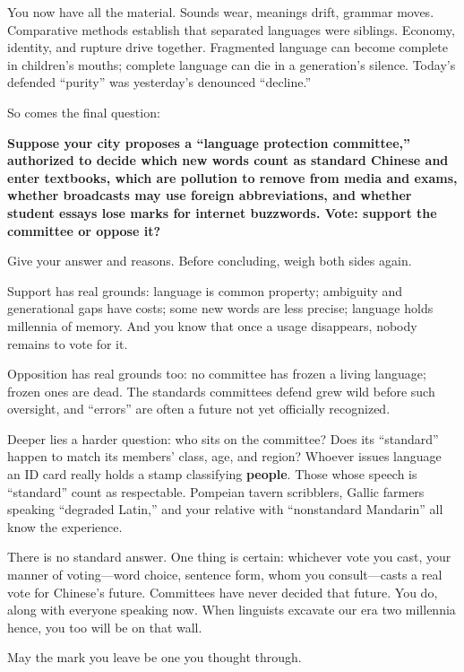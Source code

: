 You now have all the material. Sounds wear, meanings drift, grammar moves. Comparative methods establish that separated languages were siblings. Economy, identity, and rupture drive together. Fragmented language can become complete in children's mouths; complete language can die in a generation's silence. Today's defended ``purity'' was yesterday's denounced ``decline.''

So comes the final question:

\textbf{Suppose your city proposes a ``language protection committee,'' authorized to decide which new words count as standard Chinese and enter textbooks, which are pollution to remove from media and exams, whether broadcasts may use foreign abbreviations, and whether student essays lose marks for internet buzzwords. Vote: support the committee or oppose it?}

Give your answer and reasons. Before concluding, weigh both sides again.

Support has real grounds: language is common property; ambiguity and generational gaps have costs; some new words are less precise; language holds millennia of memory. And you know that once a usage disappears, nobody remains to vote for it.

Opposition has real grounds too: no committee has frozen a living language; frozen ones are dead. The standards committees defend grew wild before such oversight, and ``errors'' are often a future not yet officially recognized.

Deeper lies a harder question: who sits on the committee? Does its ``standard'' happen to match its members' class, age, and region? Whoever issues language an ID card really holds a stamp classifying \textbf{people}. Those whose speech is ``standard'' count as respectable. Pompeian tavern scribblers, Gallic farmers speaking ``degraded Latin,'' and your relative with ``nonstandard Mandarin'' all know the experience.

There is no standard answer. One thing is certain: whichever vote you cast, your manner of voting---word choice, sentence form, whom you consult---casts a real vote for Chinese's future. Committees have never decided that future. You do, along with everyone speaking now. When linguists excavate our era two millennia hence, you too will be on that wall.

May the mark you leave be one you thought through.
